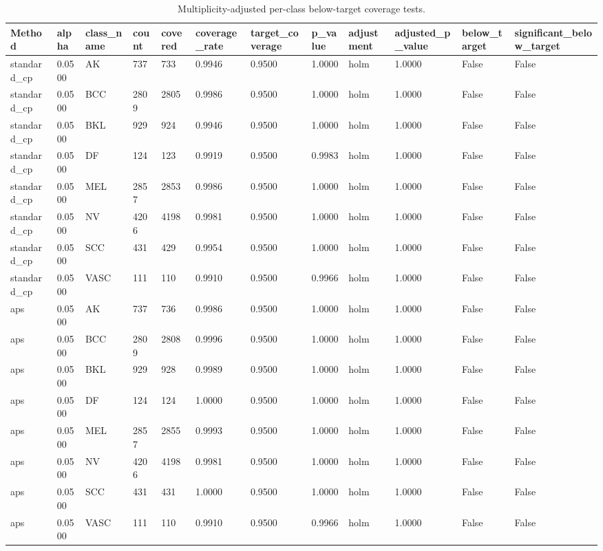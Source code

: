 \begin{table}[htbp]
\centering
\caption{Multiplicity-adjusted per-class below-target coverage tests.}
\label{tab:per\_class\_tests}
\begin{tabular}{llllllllllll}
\hline
Method & alpha & class\_name & count & covered & coverage\_rate & target\_coverage & p\_value & adjustment & adjusted\_p\_value & below\_target & significant\_below\_target \\
\hline
standard\_cp & 0.0500 & AK & 737 & 733 & 0.9946 & 0.9500 & 1.0000 & holm & 1.0000 & False & False \\
standard\_cp & 0.0500 & BCC & 2809 & 2805 & 0.9986 & 0.9500 & 1.0000 & holm & 1.0000 & False & False \\
standard\_cp & 0.0500 & BKL & 929 & 924 & 0.9946 & 0.9500 & 1.0000 & holm & 1.0000 & False & False \\
standard\_cp & 0.0500 & DF & 124 & 123 & 0.9919 & 0.9500 & 0.9983 & holm & 1.0000 & False & False \\
standard\_cp & 0.0500 & MEL & 2857 & 2853 & 0.9986 & 0.9500 & 1.0000 & holm & 1.0000 & False & False \\
standard\_cp & 0.0500 & NV & 4206 & 4198 & 0.9981 & 0.9500 & 1.0000 & holm & 1.0000 & False & False \\
standard\_cp & 0.0500 & SCC & 431 & 429 & 0.9954 & 0.9500 & 1.0000 & holm & 1.0000 & False & False \\
standard\_cp & 0.0500 & VASC & 111 & 110 & 0.9910 & 0.9500 & 0.9966 & holm & 1.0000 & False & False \\
aps & 0.0500 & AK & 737 & 736 & 0.9986 & 0.9500 & 1.0000 & holm & 1.0000 & False & False \\
aps & 0.0500 & BCC & 2809 & 2808 & 0.9996 & 0.9500 & 1.0000 & holm & 1.0000 & False & False \\
aps & 0.0500 & BKL & 929 & 928 & 0.9989 & 0.9500 & 1.0000 & holm & 1.0000 & False & False \\
aps & 0.0500 & DF & 124 & 124 & 1.0000 & 0.9500 & 1.0000 & holm & 1.0000 & False & False \\
aps & 0.0500 & MEL & 2857 & 2855 & 0.9993 & 0.9500 & 1.0000 & holm & 1.0000 & False & False \\
aps & 0.0500 & NV & 4206 & 4198 & 0.9981 & 0.9500 & 1.0000 & holm & 1.0000 & False & False \\
aps & 0.0500 & SCC & 431 & 431 & 1.0000 & 0.9500 & 1.0000 & holm & 1.0000 & False & False \\
aps & 0.0500 & VASC & 111 & 110 & 0.9910 & 0.9500 & 0.9966 & holm & 1.0000 & False & False \\

\end{tabular}
\end{table}
